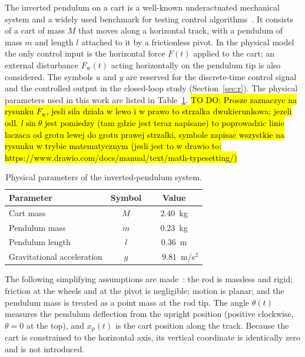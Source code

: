 \documentclass[twocolumn]{svjour3}
\begin{document}
The inverted pendulum on a cart is a well-known underactuated mechanical system and a widely
used benchmark for testing control algorithms~\cite{Prasad2014}. It consists of a
cart of mass $M$ that moves along a horizontal track, with a pendulum of mass $m$ and length
$l$ attached to it by a frictionless pivot. In the physical model the only control input is the
horizontal force $F(t)$ applied to the cart; an external disturbance $F_\mathrm{w}(t)$ acting
horizontally on the pendulum tip is also considered. The symbols $u$ and $y$ are reserved for
the discrete-time control signal and the controlled output in the closed-loop study
(Section~\ref{sec:r}). The physical parameters used in this work are listed in
Table~\ref{tab:params}.
\hl{TO DO: Prosze zaznaczyc na rysunku $F_\mathrm{w}$, jesli sila dziala w lewo i w prawo to strzalka dwukierunkowa; jezeli odl. $l\sin\theta$ jest pomiedzy (tam gdzie jest teraz napisane) to poprowadzic linie laczaca od grotu lewej do grotu prawej strzalki, symbole zapisac wszystkie na rysunku w trybie matematycznym (jesli jest to w drawio to: https://www.drawio.com/docs/manual/text/math-typesetting/)}
\setlength\tabcolsep{4pt}
\begin{table}[htbp]
\caption{Physical parameters of the inverted-pendulum system.}
\label{tab:params}
\centering
\begin{small}
\begin{tabular}{lcc}
\hline
\rule{0pt}{3mm}Parameter & Symbol & Value \\
\hline
\rule{0pt}{3.5mm}Cart mass         & $M$ & $2.40$~kg \\
Pendulum mass     & $m$ & $0.23$~kg \\
Pendulum length   & $l$ & $0.36$~m  \\
Gravitational acceleration & $g$ & $\phantom{000} 9.81$~m/s$^{2}$ \\
\hline
\end{tabular}
\end{small}
\end{table}

The following simplifying assumptions are made~\cite{Prasad2014}: the rod is massless and
rigid; friction at the wheels and at the pivot is negligible; motion is planar; and the
pendulum mass is treated as a point mass at the rod tip. The angle $\theta(t)$ measures the
pendulum deflection from the upright position (positive clockwise, $\theta=0$ at the top),
and $x_\mathrm{p}(t)$ is the cart position along the track. Because the cart is constrained to
the horizontal axis, its vertical coordinate is identically zero and is not introduced.
\end{document}
